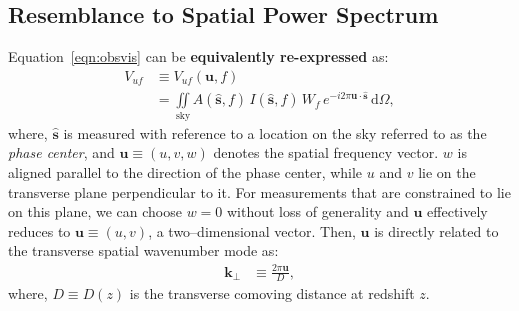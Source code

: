 \documentclass[preprint2,iop,numberedappendix]{emulateapj}
\newcommand{\dif}{\mathrm{d}}
\begin{document}
\subsection{Resemblance to Spatial Power Spectrum}\label{sec:power-spectrum}

Equation~\ref{eqn:obsvis} can be {\bf equivalently re-expressed} as:
\begin{align}\label{eqn:vis}
  V_{uf} &\equiv V_{uf}(\boldsymbol{u},f) \nonumber\\
  &= \iint\limits_\textrm{sky} A(\hat{\boldsymbol{s}},f)\,I(\hat{\boldsymbol{s}},f)\,W_f\,e^{-i2\pi\boldsymbol{u}\cdot\hat{\boldsymbol{s}}}\,\dif\Omega,
\end{align}
where, $\hat{\boldsymbol{s}}$ is measured with reference to a location on the sky referred to as the {\it phase center}, and $\boldsymbol{u}\equiv (u,v,w)$ denotes the spatial frequency vector. $w$ is aligned parallel to the direction of the phase center, while $u$ and $v$ lie on the transverse plane perpendicular to it. For measurements that are constrained to lie on this plane, we can choose $w=0$ without loss of generality and $\boldsymbol{u}$ effectively reduces to $\boldsymbol{u}\equiv (u,v)$, a two--dimensional vector. Then, $\boldsymbol{u}$ is directly related to the transverse spatial wavenumber mode as: 
\begin{align}\label{eqn:k-perp}
  \boldsymbol{k}_\perp &\equiv \frac{2\pi\boldsymbol{u}}{D}, 
\end{align}
where, $D\equiv D(z)$ is the transverse comoving distance at redshift $z$. %
\end{document}
